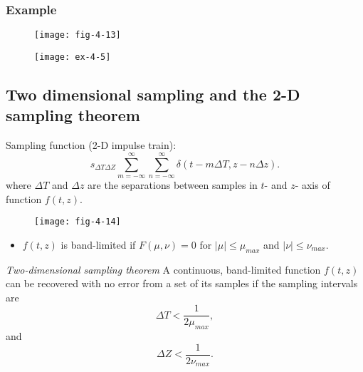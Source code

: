 \begin{frame}
\frametitle{Example}
\begin{figure}
\centering
\texttt{[image: fig-4-13]}
\end{figure}
\begin{figure}
\centering
\texttt{[image: ex-4-5]}
\end{figure}
\end{frame}


\subsection{Two dimensional sampling and the 2-D sampling theorem}


\begin{frame}
Sampling function (2-D impulse train):
\begin{equation}
s_{\Delta T \Delta Z} \sum_{m=-\infty}^{\infty} \sum_{n=-\infty}^{\infty} \delta(t-m\Delta T, z - n\Delta z).
\end{equation}
where $\Delta T$ and $\Delta z$ are the separations between samples in $t$- and $z$- axis of function $f(t,z)$.
\begin{figure}
\centering
\texttt{[image: fig-4-14]}
\end{figure}
\end{frame}


\begin{frame}
\begin{itemize}
\item $f(t,z)$ is band-limited if $F(\mu,\nu) = 0$ for $|\mu| \leq \mu_{max}$ and $|\nu| \leq \nu_{max}$.
\end{itemize}
\begin{block}{\textit{Two-dimensional sampling theorem}}
A continuous, band-limited function $f(t,z)$ can be recovered with no error from a set of its samples if the sampling intervals are
\begin{equation}
\Delta T < \dfrac{1}{2\mu_{max}},
\end{equation}
and
\begin{equation}
\Delta Z < \dfrac{1}{2\nu_{max}}.
\end{equation}
\end{block}
\end{frame}

